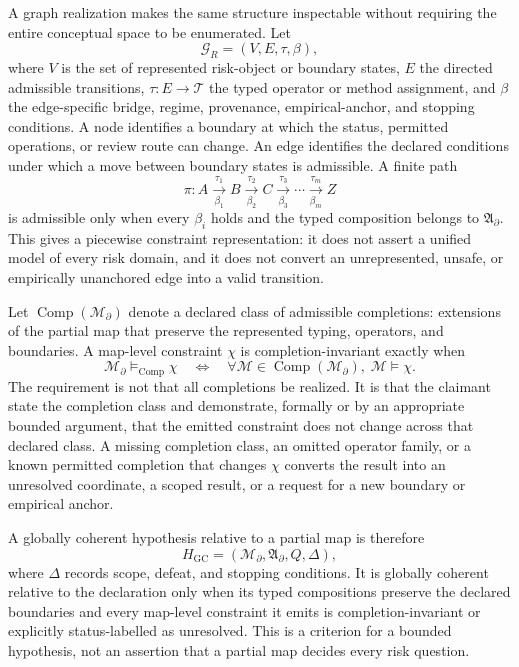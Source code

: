 \documentclass[10pt]{article}
\begin{document}
A graph realization makes the same structure inspectable without requiring the entire conceptual space to be enumerated. Let
\begin{equation}
\mathcal{G}_{R}=(V,E,\tau,\beta),
\label{eq:risk-constraint-graph-supp}
\end{equation}
where $V$ is the set of represented risk-object or boundary states, $E$ the directed admissible transitions, $\tau:E\rightarrow\mathcal{T}$ the typed operator or method assignment, and $\beta$ the edge-specific bridge, regime, provenance, empirical-anchor, and stopping conditions. A node identifies a boundary at which the status, permitted operations, or review route can change. An edge identifies the declared conditions under which a move between boundary states is admissible. A finite path
\begin{equation}
\pi: A \xrightarrow[\beta_1]{\tau_1} B \xrightarrow[\beta_2]{\tau_2} C \xrightarrow[\beta_3]{\tau_3}\cdots\xrightarrow[\beta_m]{\tau_m}Z
\label{eq:piecewise-composition-supp}
\end{equation}
is admissible only when every $\beta_i$ holds and the typed composition belongs to $\mathfrak{A}_{\partial}$. This gives a piecewise constraint representation: it does not assert a unified model of every risk domain, and it does not convert an unrepresented, unsafe, or empirically unanchored edge into a valid transition.

Let $\operatorname{Comp}(\mathcal{M}_{\partial})$ denote a declared class of admissible completions: extensions of the partial map that preserve the represented typing, operators, and boundaries. A map-level constraint $\chi$ is completion-invariant exactly when
\begin{equation}
\mathcal{M}_{\partial}\models_{\operatorname{Comp}}\chi
\quad\Longleftrightarrow\quad
\forall \mathcal{M}\in\operatorname{Comp}(\mathcal{M}_{\partial}),\;\mathcal{M}\models\chi.
\label{eq:completion-invariance-supp}
\end{equation}
The requirement is not that all completions be realized. It is that the claimant state the completion class and demonstrate, formally or by an appropriate bounded argument, that the emitted constraint does not change across that declared class. A missing completion class, an omitted operator family, or a known permitted completion that changes $\chi$ converts the result into an unresolved coordinate, a scoped result, or a request for a new boundary or empirical anchor.

A globally coherent hypothesis relative to a partial map is therefore
\begin{equation}
H_{\mathrm{GC}}=(\mathcal{M}_{\partial},\mathfrak{A}_{\partial},Q,\Delta),
\label{eq:gc-hypothesis-supp}
\end{equation}
where $\Delta$ records scope, defeat, and stopping conditions. It is globally coherent relative to the declaration only when its typed compositions preserve the declared boundaries and every map-level constraint it emits is completion-invariant or explicitly status-labelled as unresolved. This is a criterion for a bounded hypothesis, not an assertion that a partial map decides every risk question.
\end{document}
